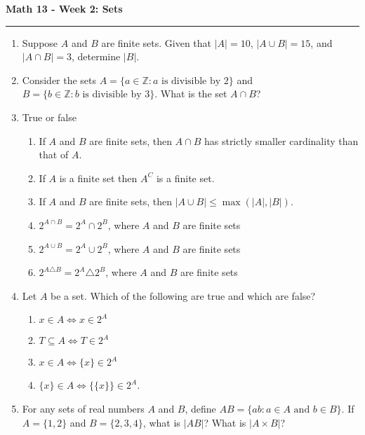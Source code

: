 \documentclass[12pt]{report}
\theoremstyle{definition}
\newcommand{\integers}{\mathbb{Z}}
\begin{document}
\begin{center}
{\bf \Large Math 13 - Week 2: Sets}
\vspace{0.2cm}
\hrule
\end{center}

\begin{enumerate}
	\item Suppose $A$ and $B$ are finite sets. Given that $|A| = 10$, $|A\cup B| = 15$, and $|A\cap B| = 3$, determine $|B|$.

	\vfill

	\item Consider the sets $A = \{a\in \integers: a\text{ is divisible by 2}\}$ and $B = \{b\in \integers: b\text{ is divisible by 3}\}$. What is the set $A\cap B$?

	\vfill

	\item True or false
	\begin{enumerate}
		\item If $A$ and $B$ are finite sets, then $A\cap B$ has strictly smaller cardinality than that of $A$.
		\item If $A$ is a finite set then $A^C$ is a finite set.
		\item If $A$ and $B$ are finite sets, then $|A\cup B|\leq \max(|A|, |B|)$.
		\item $2^{A\cap B} = 2^A\cap 2^B$, where $A$ and $B$ are finite sets
		\item $2^{A\cup B} = 2^A\cup 2^B$, where $A$ and $B$ are finite sets
		\item $2^{A\triangle B} = 2^A\triangle 2^B$, where $A$ and $B$ are finite sets
	\end{enumerate}
	\vfill
	\pagebreak

	\item Let $A$ be a set. Which of the following are true and which are false?
	\begin{enumerate}
		\item $x\in A \iff x\in 2^A$
		\item $T\subseteq A \iff T\in 2^A$
		\item $x\in A\iff \{x\}\in 2^A$
		\item $\{x\}\in A\iff \{\{x\}\}\in 2^A$.
	\end{enumerate}

	\vfill

	\item For any sets of real numbers $A$ and $B$, define $AB = \{ab: a\in A \text{ and }b\in B\}$. If $A = \{1,2\}$ and $B = \{2,3,4\}$, what is $|AB|$? What is $|A\times B|$?


\end{enumerate}
\end{document}
